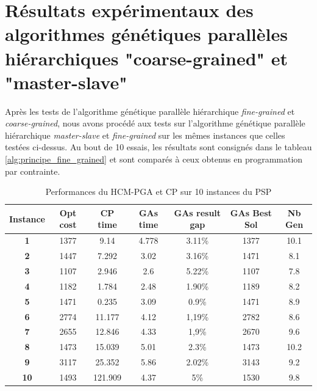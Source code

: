 \documentclass[12pt,a4paper]{article}
\begin{document}
		\section{Résultats expérimentaux des algorithmes génétiques parallèles hiérarchiques "coarse-grained" et "master-slave"}
		
		Après les tests de l'algorithme génétique parallèle hiérarchique \emph{fine-grained} et \emph{coarse-grained}, nous avons procédé aux tests sur l'algorithme génétique parallèle hiérarchique \emph{master-slave} et \emph{fine-grained} sur les mêmes instances que celles testées ci-dessus. Au bout de 10 essais, les résultats sont consignés dans le tableau \ref{alg:principe_fine_grained} et sont comparés à ceux obtenus en programmation par contrainte.
		
		\begin{table}[h]
		\centering
		\begin{tabular}{|c|c|c|c|c|c|c|}
			\hline
			\textbf{Instance} & \textbf{Opt cost} & \textbf{CP time} & \textbf{GAs time} & \textbf{GAs result gap} & \textbf{GAs Best Sol} & \textbf{Nb Gen}\\
			\hline
			\textbf{1} & 1377 & 9.14 & 4.778 & 3.11\% & 1377 & 10.1 \\
			\textbf{2} & 1447 & 7.292 & 3.02 & 3.16\% & 1471 & 8.1\\
			\textbf{3} & 1107 & 2.946 & 2.6 & 5.22\% & 1107 & 7.8\\
			\textbf{4} & 1182 & 1.784 & 2.48 & 1.90\% & 1189 & 8.2\\
			\textbf{5} & 1471 & 0.235 & 3.09 & 0.9\% & 1471 & 8.9\\
			\textbf{6} & 2774 & 11.177 & 4.12 & 1,19\% & 2782 & 8.6\\
			\textbf{7} & 2655 & 12.846 & 4.33 & 1,9\% & 2670 & 9.6\\
			\textbf{8} & 1473 & 15.039 & 5.01 & 2.3\% & 1473 & 10.2\\
			\textbf{9} & 3117 & 25.352 & 5.86 & 2.02\% & 3143 & 9.2\\
			\textbf{10} & 1493 & 121.909 & 4.37 & 5\% & 1530 & 9.8\\
			\hline
		\end{tabular}	
		\caption{Performances du HCM-PGA et CP sur 10 instances du PSP}	
	\end{table}	
	
\end{document}
